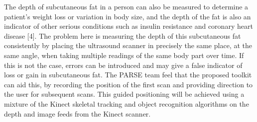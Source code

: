 The depth of subcutaneous fat in a person can also be measured to determine a patient's weight loss or variation in body size, and the depth of the fat is also an indicator of other serious conditions such as insulin resistance \cite{Goodpaster1997} and coronary heart disease [4]. The problem here is measuring the depth of this subcutaneous fat consistently by placing the ultrasound scanner in precisely the same place, at the same angle, when taking multiple readings of the same body part over time. If this is not the case, errors can be introduced and may give a false indicator of loss or gain in subcutaneous fat. The PARSE team feel that the proposed toolkit can aid this, by recording the position of the first scan and providing direction to the user for subsequent scans. This guided positioning will be achieved using a mixture of the Kinect skeletal tracking and object recognition algorithms on the depth and image feeds from the Kinect scanner.\\ 